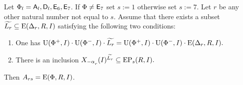 \begin{lemma}\label{Stein_reduction}
Let $\Phi_l = \mathsf{A}_l, \mathsf{D}_l, \mathsf{E}_6, \mathsf{E}_7$. If $\Phi\neq \mathsf{E}_7$ set $s:=1$ otherwise set $s:=7$. 
Let $r$ be any other natural number not equal to $s$.
Assume that there exists a subset $\widetilde{L_r} \subseteq \operatorname{E}(\Delta_r, R, I)$ satisfying the following two conditions:
\begin{enumerate}[label=(\alph*)] 
 \item\label{stein_cond1} One has $\operatorname{U}(\Phi^+, I)\cdot \operatorname{U}(\Phi^-, I) \cdot \widetilde{L_r} = \operatorname{U}(\Phi^+, I)\cdot \operatorname{U}(\Phi^-, I) \cdot \operatorname{E}(\Delta_r, R, I).$
 \item\label{stein_cond2} There is an inclusion $X_{-\alpha\ssub{r}}(I)^{\widetilde{L_r}} \subseteq \EP_s(R, I).$
\end{enumerate}
Then $A_{rs} = \operatorname{E}(\Phi, R, I)$. \end{lemma}
